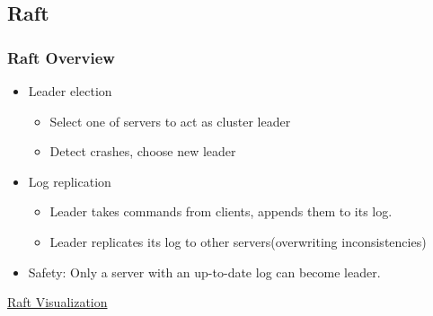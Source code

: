 \subsection{Raft}

\begin{frame}
    \frametitle{Raft Overview}
    \begin{itemize}
        \item Leader election
            \begin{itemize}
                \item Select one of servers to act as cluster leader
                \item Detect crashes, choose new leader
            \end{itemize}
        \item Log replication
            \begin{itemize}
                \item Leader takes commands from clients, appends them to its log.
                \item Leader replicates its log to other servers(overwriting inconsistencies)
            \end{itemize}
        \item Safety: Only a server with an up-to-date log can become leader.
    \end{itemize}
\end{frame}

\begin{frame}
    \centering
    \href{http://thesecretlivesofdata.com/raft/}{Raft Visualization}
\end{frame}

